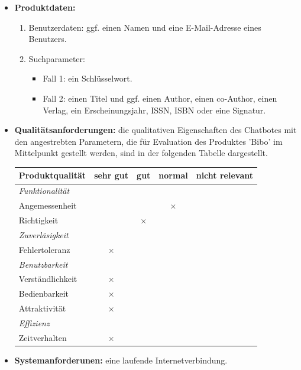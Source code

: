 \documentclass[12pt,a4paper]{scrartcl}
\begin{document}
\begin{itemize}
\item \textbf{Produktdaten:}
\begin{enumerate}
\item Benutzerdaten: ggf. einen Namen und eine E-Mail-Adresse eines Benutzers.
\item Suchparameter:
\begin{itemize}
\item Fall 1: ein Schlüsselwort.
\item Fall 2: einen Titel und ggf. einen Author, einen co-Author, einen Verlag, ein Erscheinungsjahr, ISSN, ISBN oder eine Signatur.
\end{itemize}
\end{enumerate}
\item \textbf{Qualitätsanforderungen:} die qualitativen Eigenschaften des Chatbotes mit den angestrebten Parametern, die für Evaluation des Produktes 'Bibo' im Mittelpunkt gestellt werden, sind in der folgenden Tabelle dargestellt.

\begin{center}
\begin{tabular}{| l| c c c c |}
\hline
Produktqualität & sehr gut & gut & normal & nicht relevant  \\ 
\hline
\textit{Funktionalität}& & & &\\  
Angemessenheit &  &  & $\times$&\\ 
Richtigkeit &  &$\times$  & &\\  
\hline
\textit{Zuverläsigkeit}  &  &  & &\\ 
Fehlertoleranz & $\times$ &  & &\\ 

\hline
\textit{Benutzbarkeit} &  &  & &\\ 
Verständlichkeit &$\times$  &  & &\\ 
Bedienbarkeit & $\times$ &  & &\\ 
Attraktivität & $\times$ &  & &\\ 
\hline
\textit{Effizienz}  &  &  & &\\ 
Zeitverhalten &$\times$   &  & &\\ 
\hline
\end{tabular}
\end{center}

\item \textbf{Systemanforderunen:} eine laufende Internetverbindung.
\end{itemize}
\newpage
\end{document}
